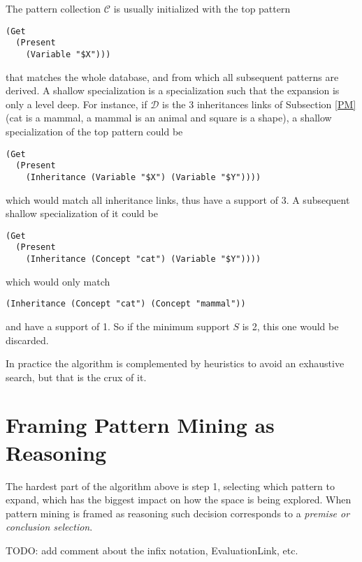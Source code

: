 \documentclass[runningheads]{llncs}
\begin{document}
The pattern collection $\mathcal{C}$ is usually initialized with the
top pattern
\begin{verbatim}
(Get
  (Present
    (Variable "$X")))
\end{verbatim}
that matches the whole database, and from which all subsequent
patterns are derived. A shallow specialization is a specialization
such that the expansion is only a level deep. For instance, if
$\mathcal{D}$ is the 3 inheritances links of Subsection \ref{PM} (cat
is a mammal, a mammal is an animal and square is a shape), a shallow
specialization of the top pattern could be
\begin{verbatim}
(Get
  (Present
    (Inheritance (Variable "$X") (Variable "$Y"))))
\end{verbatim}
which would match all inheritance links, thus have a support of 3. A
subsequent shallow specialization of it could be
\begin{verbatim}
(Get
  (Present
    (Inheritance (Concept "cat") (Variable "$Y"))))
\end{verbatim}
which would only match
\begin{verbatim}
(Inheritance (Concept "cat") (Concept "mammal"))
\end{verbatim}
and have a support of 1. So if the minimum support $S$ is 2, this one
would be discarded.

In practice the algorithm is complemented by heuristics to avoid an
exhaustive search, but that is the crux of it.

\section{Framing Pattern Mining as Reasoning}
\label{FPMR}

The hardest part of the algorithm above is step 1, selecting which
pattern to expand, which has the biggest impact on how the space is
being explored. When pattern mining is framed as reasoning such
decision corresponds to a \emph{premise or conclusion selection}.

TODO: add comment about the infix notation, EvaluationLink, etc.
\end{document}
